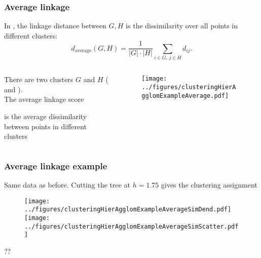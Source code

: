 \documentclass{beamer}
\begin{document}
\begin{frame}
\frametitle{Average linkage}
In , the linkage distance between $G,H$ is the  
dissimilarity over all points in different clusters:
\[
d_{\textrm{average}}(G,H) = \frac{1}{|G| \cdot |H| }\sum_{i \in G, \,j \in H} d_{ij}.
\]
\begin{columns}[T]
\begin{column}{.52\textwidth}
\vsp


 There are two clusters $G$ and $H$ ( and ).  \\ The average linkage
score 


is the average dissimilarity between  points in different clusters


\end{column}
\begin{column}{.48\textwidth}
\begin{figure}[h!]
  \centering
  \texttt{[image: ../figures/clusteringHierAgglomExampleAverage.pdf]}
\end{figure}
\end{column}
\end{columns}
\end{frame}

\begin{frame}
\frametitle{Average linkage example}
Same data as before.  Cutting the tree at $h= 1.75$ gives the clustering assignment
\begin{figure}[h!]
  \centering
  \texttt{[image: ../figures/clusteringHierAgglomExampleAverageSimDend.pdf]}
  \texttt{[image: ../figures/clusteringHierAgglomExampleAverageSimScatter.pdf]}  
\end{figure}
 ??

\end{frame}
\end{document}
